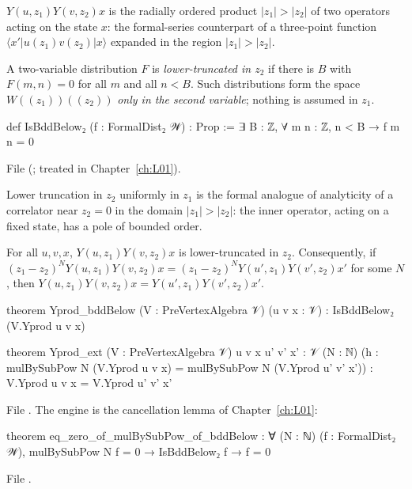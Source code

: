 \begin{physics}
$Y(u,z_1)Y(v,z_2)x$ is the radially ordered product $|z_1|>|z_2|$ of two operators acting on the
state $x$: the formal-series counterpart of a three-point function
$\langle x'|u(z_1)v(z_2)|x\rangle$ expanded in the region $|z_1|>|z_2|$.
\end{physics}

\begin{definition}\label{l03:def:bdd2}
A two-variable distribution $F$ is \emph{lower-truncated in $z_2$} if there is $B$ with
$F(m,n) = 0$ for all $m$ and all $n<B$. Such distributions form the space $W((z_1))((z_2))$ \emph{only
in the second variable}; nothing is assumed in $z_1$.
\end{definition}
\begin{leancode}
def IsBddBelow₂ (f : FormalDist₂ 𝒲) : Prop := ∃ B : ℤ, ∀ m n : ℤ, n < B → f m n = 0
\end{leancode}
File 
(; treated in Chapter~\ref{ch:L01}).

\begin{physics}
Lower truncation in $z_2$ uniformly in $z_1$ is the formal analogue of analyticity of a correlator
near $z_2 = 0$ in the domain $|z_1|>|z_2|$: the inner operator, acting on a fixed state, has a pole
of bounded order.
\end{physics}

\begin{theorem}\label{l03:thm:yprodext}
For all $u,v,x$, $Y(u,z_1)Y(v,z_2)x$ is lower-truncated in $z_2$. Consequently, if
$(z_1-z_2)^NY(u,z_1)Y(v,z_2)x = (z_1-z_2)^NY(u',z_1)Y(v',z_2)x'$ for some $N$, then
$Y(u,z_1)Y(v,z_2)x = Y(u',z_1)Y(v',z_2)x'$.
\end{theorem}
\begin{leancode}
theorem Yprod_bddBelow (V : PreVertexAlgebra 𝒱) (u v x : 𝒱) : IsBddBelow₂ (V.Yprod u v x)

theorem Yprod_ext (V : PreVertexAlgebra 𝒱) {u v x u' v' x' : 𝒱} (N : ℕ)
    (h : mulBySubPow N (V.Yprod u v x) = mulBySubPow N (V.Yprod u' v' x')) :
    V.Yprod u v x = V.Yprod u' v' x'
\end{leancode}
File . The engine is the cancellation lemma of
Chapter~\ref{ch:L01}:
\begin{leancode}
theorem eq_zero_of_mulBySubPow_of_bddBelow :
    ∀ (N : ℕ) (f : FormalDist₂ 𝒲), mulBySubPow N f = 0 → IsBddBelow₂ f → f = 0
\end{leancode}
File .

